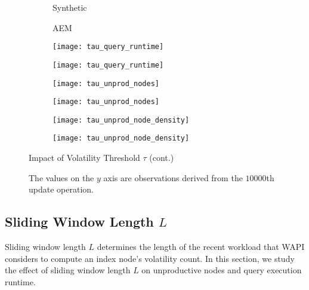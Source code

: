 \documentclass[abstracton,12pt]{scrartcl}
\theoremstyle{definition}
\begin{document}
\begin{figure}[h]\ContinuedFloat
  \centering
  \begin{subfigure}{0.49\linewidth}
    \centering
    Synthetic
  \end{subfigure}
  \begin{subfigure}{0.49\linewidth}
    \centering
    AEM
  \end{subfigure}
  \begin{subfigure}{0.49\linewidth}
    \centering
    \texttt{[image: tau\_query\_runtime]}
    \caption{}
    \label{fig:tau_query_runtime_synthetic}
  \end{subfigure}
  \begin{subfigure}{0.49\linewidth}
    \centering
    \texttt{[image: tau\_query\_runtime]}
    \caption{}
    \label{fig:tau_query_runtime_aem}
  \end{subfigure}
  \begin{subfigure}{0.49\linewidth}
    \centering
    \texttt{[image: tau\_unprod\_nodes]}
    \caption{}
    \label{fig:tau_unprod_nodes_synthetic}
  \end{subfigure}
  \begin{subfigure}{0.49\linewidth}
    \centering
    \texttt{[image: tau\_unprod\_nodes]}
    \caption{}
    \label{fig:tau_unprod_nodes_aem}
  \end{subfigure}
  \begin{subfigure}{0.49\linewidth}
    \centering
    \texttt{[image: tau\_unprod\_node\_density]}
    \caption{}
    \label{fig:tau_unprod_node_density_synthetic}
  \end{subfigure}
  \begin{subfigure}{0.49\linewidth}
    \centering
    \texttt{[image: tau\_unprod\_node\_density]}
    \caption{}
    \label{fig:tau_unprod_node_density_aem}
  \end{subfigure}
  \caption{Impact of Volatility Threshold $\tau$ (cont.)}
  \caption*{\footnotesize The values on the $y$ axis are observations derived from the $10000$th
    update operation. }
  \label{fig:volatility_threshold}
\end{figure}

\subsection{Sliding Window Length $L$}

Sliding window length $L$ determines the length of the recent workload that WAPI
considers to compute an index node's volatility count. In this section, we study
the effect of sliding window length $L$ on unproductive nodes and query
execution runtime.
\end{document}
